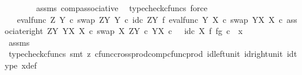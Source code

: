 \begin{isabellebody}
\ \ \ \ \ \ \isamarkupfalse%
\ assms\ comp{\isacharunderscore}{\kern0pt}associative{}\ \isamarkupfalse%
\ {\isacharparenleft}{\kern0pt}typecheck{\isacharunderscore}{\kern0pt}cfuncs{\isacharcomma}{\kern0pt}\ force{\isacharparenright}{\kern0pt}\isanewline
\ \ \ \ \isamarkupfalse%
\ \isamarkupfalse%
\ {\isachardoublequoteopen}{\isachardot}{\kern0pt}{\isachardot}{\kern0pt}{\isachardot}{\kern0pt}\ {\isacharequal}{\kern0pt}\ {\isacharparenleft}{\kern0pt}eval{\isacharunderscore}{\kern0pt}func\ Z\ Y\ {\isasymcirc}\isactrlsub c\ swap\ {\isacharparenleft}{\kern0pt}Z\isactrlbsup Y\isactrlesup {\isacharparenright}{\kern0pt}\ Y\ {\isasymcirc}\isactrlsub c\ {\isacharparenleft}{\kern0pt}id\isactrlsub c\ {\isacharparenleft}{\kern0pt}Z\isactrlbsup Y\isactrlesup {\isacharparenright}{\kern0pt}\ {\isasymtimes}\isactrlsub f\ eval{\isacharunderscore}{\kern0pt}func\ Y\ X\ {\isasymcirc}\isactrlsub c\ swap\ {\isacharparenleft}{\kern0pt}Y\isactrlbsup X\isactrlesup {\isacharparenright}{\kern0pt}\ X{\isacharparenright}{\kern0pt}\ {\isasymcirc}\isactrlsub c\ associate{\isacharunderscore}{\kern0pt}right\ {\isacharparenleft}{\kern0pt}Z\isactrlbsup Y\isactrlesup {\isacharparenright}{\kern0pt}\ {\isacharparenleft}{\kern0pt}Y\isactrlbsup X\isactrlesup {\isacharparenright}{\kern0pt}\ X\ {\isasymcirc}\isactrlsub c\ swap\ X\ {\isacharparenleft}{\kern0pt}Z\isactrlbsup Y\isactrlesup \ {\isasymtimes}\isactrlsub c\ Y\isactrlbsup X\isactrlesup {\isacharparenright}{\kern0pt}{\isacharparenright}{\kern0pt}\ {\isasymcirc}\isactrlsub c\ \ \ {\isacharparenleft}{\kern0pt}{\isacharparenleft}{\kern0pt}id\isactrlsub c\ X\ {\isasymtimes}\isactrlsub f\ {\isasymlangle}f{\isacharcomma}{\kern0pt}g{\isasymrangle}{\isacharparenright}{\kern0pt}\ {\isasymcirc}\isactrlsub c\ \ x{}{\isacharparenright}{\kern0pt}{\isachardoublequoteclose}\isanewline
\ \ \ \ \ \ \isamarkupfalse%
\ assms\ \isamarkupfalse%
\ {\isacharparenleft}{\kern0pt}typecheck{\isacharunderscore}{\kern0pt}cfuncs{\isacharcomma}{\kern0pt}\ smt\ {\isacharparenleft}{\kern0pt}z{}{\isacharparenright}{\kern0pt}\ cfunc{\isacharunderscore}{\kern0pt}cross{\isacharunderscore}{\kern0pt}prod{\isacharunderscore}{\kern0pt}comp{\isacharunderscore}{\kern0pt}cfunc{\isacharunderscore}{\kern0pt}prod\ id{\isacharunderscore}{\kern0pt}left{\isacharunderscore}{\kern0pt}unit{}\ id{\isacharunderscore}{\kern0pt}right{\isacharunderscore}{\kern0pt}unit{}\ id{\isacharunderscore}{\kern0pt}type\ x{\isacharunderscore}{\kern0pt}def{\isacharparenright}{\kern0pt}\isanewline

\end{isabellebody}
